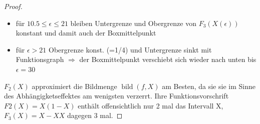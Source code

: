 \documentclass[12pt]{extreport} %
\theoremstyle{named}
\theoremstyle{nnamed}
\theoremstyle{itshape}
\theoremstyle{normal}
\begin{document}
\begin{enumerate}
\begin{proof}
\begin{itemize}
				\item für $10.5 \leq \epsilon \leq 21$ bleiben Untergrenze  und Obergrenze von $F_3(X(\epsilon))$ konstant und damit auch der Boxmittelpunkt
				\item für $\epsilon>21$ Obergrenze konst. (=1/4) und Untergrenze sinkt mit Funktionsgraph $\Rightarrow$ der Boxmittelpunkt verschiebt sich wieder nach unten bis $\epsilon=30$
			\end{itemize}
			$F_2(X)$ approximiert die Bildmenge $\operatorname{bild}(f,X)$ am Besten, da sie sie im Sinne des Abhängigketseffektes am wenigsten verzerrt. Ihre Funktionsvorschrift $F2(X)=X(1-X)$ enthält offensichtlich nur 2 mal das Intervall X, $F_3(X)=X-XX$ dagegen 3 mal.
		\end{proof}
\end{enumerate}
\end{document}
